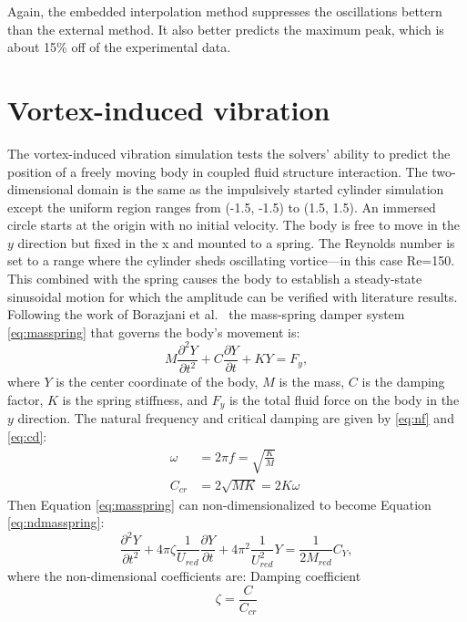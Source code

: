 Again, the embedded interpolation method suppresses the oscillations bettern than the external method. It also better predicts the maximum peak, which is about 15\% off of the experimental data.
\section{Vortex-induced vibration}
The vortex-induced vibration simulation tests the solvers' ability to predict the position of a freely moving body in coupled fluid structure interaction. 
The two-dimensional domain is the same as the impulsively started cylinder simulation except the uniform region ranges from (-1.5, -1.5) to (1.5, 1.5). 
An immersed circle starts at the origin with no initial velocity. 
The body is free to move in the $y$ direction but fixed in the x and mounted to a spring. 
The Reynolds number is set to a range where the cylinder sheds oscillating vortice---in this case Re=150. 
This combined with the spring causes the body to establish a steady-state sinusoidal motion for which the amplitude can be verified with literature results. 
Following the work of Borazjani et al.~\cite{borazjani2008curvilinear} the mass-spring damper system \eqref{eq:masspring} that governs the body's movement is:
\begin{equation}
M\frac{\partial^2Y}{\partial t^2}+C\frac{\partial Y}{\partial t}+KY=F_y, \label{eq:masspring}
\end{equation}
where $Y$ is the center coordinate of the body, $M$ is the mass, $C$ is the damping factor, $K$ is the spring stiffness, and $F_y$ is the total fluid force on the body in the $y$ direction. 
The natural frequency and critical damping are given by \eqref{eq:nf} and \eqref{eq:cd}: 
\begin{align}
\omega &=2\pi f =\sqrt{\frac{K}{M}}\label{eq:nf}\\
C_{cr}&=2\sqrt{MK}=2K\omega \; \label{eq:cd}
\end{align}
Then Equation \eqref{eq:masspring} can non-dimensionalized to become Equation \eqref{eq:ndmasspring}:
\begin{equation}
\frac{\partial^2 Y}{\partial t^2}+4\pi \zeta\frac{1}{U_{red}}\frac{\partial Y}{\partial t}+4\pi^2\frac{1}{U_{red}^2}Y=\frac{1}{2M_{red}}C_Y,\label{eq:ndmasspring}
\end{equation}
where the non-dimensional coefficients are:\newline
Damping coefficient
\begin{equation}
\zeta=\frac{C}{C_{cr}}\label{eq:damping coefficient}
\end{equation}
